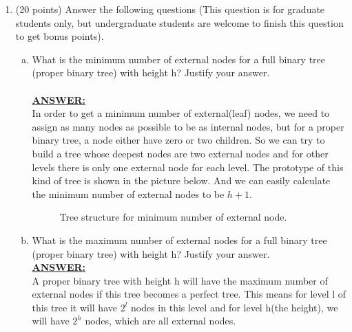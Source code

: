 \documentclass{article}
\newcommand{\answer}{\textbf{\\\underline{ANSWER:}\\}}
\begin{document}
\begin{enumerate}
\item(20 points) Answer the following questions (This question is for
graduate students only, but undergraduate students are welcome to
finish this question to get bonus points).
\begin{enumerate}[(a)]
\item What is the minimum number of external nodes for a full
  binary tree (proper binary tree) with height h? Justify your answer.\\
  \answer In order to get a minimum number of external(leaf) nodes, we
    need to assign as many nodes as possible to be as internal nodes,
    but for a proper binary tree, a node either have zero or two
    children. So we can try to build a tree whose deepest nodes are
    two external nodes and for other levels there is only one external
    node for each level. The prototype of this kind of tree is shown
    in the picture below. And we can easily calculate the minimum
    number of external nodes to be $h+1$.  \\
    \begin{figure}[H]
      \begin{center}
        \caption{Tree structure for minimum number of external
          node.\label{fig:int_ext}} 
        \vspace{-15pt}
        \end{center}
      \end{figure}

\item What is the maximum number of external nodes for a full
  binary tree (proper binary tree) with height h? Justify your
  answer. 
  \answer A proper binary tree with height h will have the maximum
  number of external nodes if this tree becomes a perfect tree. This
  means for level l of this tree it will have $2^l$ nodes in this
  level and for level h(the height), we will have $2^h$ nodes, which
  are all external nodes. 


\end{enumerate}
\end{enumerate}
\end{document}
